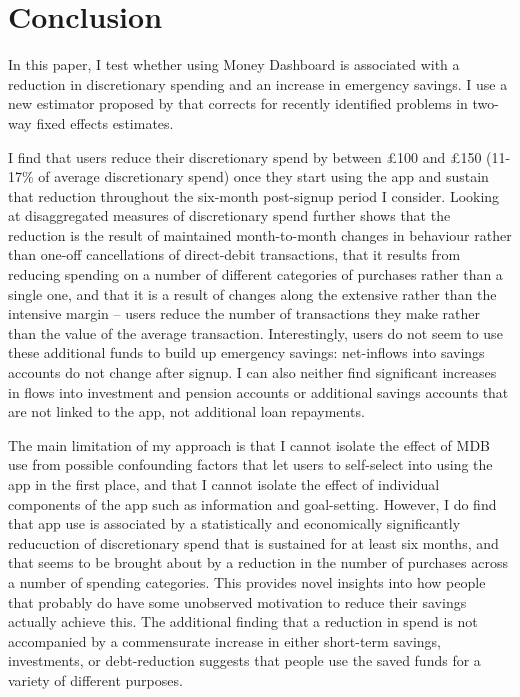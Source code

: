 
\section{Conclusion}
\label{sec:conclusion}

In this paper, I test whether using Money Dashboard is associated
with a reduction in discretionary spending and an increase in emergency
savings. I use a new estimator proposed by \citet{callaway2021difference}
that corrects for recently identified problems in two-way fixed effects
estimates.

I find that users reduce their discretionary spend by between \pounds100 and
\pounds150 (11-17\% of average discretionary spend) once they start using the
app and sustain that reduction throughout the six-month post-signup period I
consider. Looking at disaggregated measures of discretionary spend further
shows that the reduction is the result of maintained month-to-month changes in
behaviour rather than one-off cancellations of direct-debit transactions, that
it results from reducing spending on a number of different categories of
purchases rather than a single one, and that it is a result of changes along
the extensive rather than the intensive margin -- users reduce the number of
transactions they make rather than the value of the average transaction.
Interestingly, users do not seem to use these additional funds to build up
emergency savings: net-inflows into savings accounts do not change after
signup. I can also neither find significant increases in flows into investment
and pension accounts or additional savings accounts that are not linked to the
app, not additional loan repayments.

The main limitation of my approach is that I cannot isolate the effect of MDB
use from possible confounding factors that let users to self-select into using
the app in the first place, and that I cannot isolate the effect of individual
components of the app such as information and goal-setting. However, I do find
that app use is associated by a statistically and economically significantly
reducuction of discretionary spend that is sustained for at least six months,
and that seems to be brought about by a reduction in the number of purchases
across a number of spending categories. This provides novel insights into how
people that probably do have some unobserved motivation to reduce their savings
actually achieve this. The additional finding that a reduction in spend is not
accompanied by a commensurate increase in either short-term savings,
investments, or debt-reduction suggests that people use the saved funds for a
variety of different purposes.



